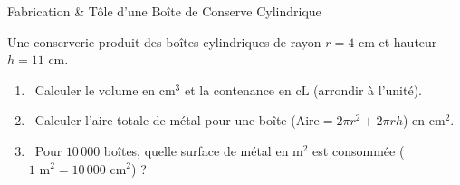 \begin{exercice}[3 pts][\capSApproprier]{Fabrication \& Tôle d'une Boîte de Conserve Cylindrique}
\noindent
\begin{minipage}[c]{0.58\linewidth}
Une conserverie produit des boîtes cylindriques de rayon $r = 4\text{ cm}$ et hauteur $h = 11\text{ cm}$.
\begin{enumerate}[leftmargin=1.2em, itemsep=1pt]
    \item \capRealiser\ Calculer le volume en $\text{cm}^3$ et la contenance en $\text{cL}$ (arrondir à l'unité).
    \item \capRealiser\ Calculer l'aire totale de métal pour une boîte ($\text{Aire} = 2\pi r^2 + 2\pi r h$) en $\text{cm}^2$.
    \item \capValider\ Pour $10\,000$ boîtes, quelle surface de métal en $\text{m}^2$ est consommée ($1\text{ m}^2 = 10\,000\text{ cm}^2$) ?
\end{enumerate}
\end{minipage}\hfill
\begin{minipage}[c]{0.38\linewidth}
\centering
{}
\end{minipage}

\vspace{1mm}
\lignesreponse[2]
\end{exercice}

\newpage

